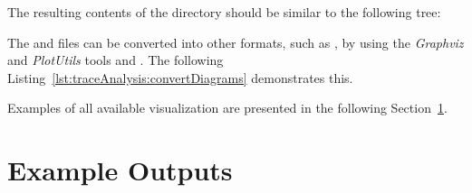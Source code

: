 \setBashListing



\enlargethispage{1cm}


\pagebreak

The resulting contents of the  directory should be similar to %
the following tree:

\begin{figure}[H]
\begin{graybox}
\end{graybox}
\end{figure}

\noindent The  and  files can be converted into other formats, %
such as , by using the \textit{Graphviz} and \textit{PlotUtils} tools %
 and . %
The following Listing~\ref{lst:traceAnalysis:convertDiagrams} demonstrates this. %




%


\vspace{5mm}

Examples of all available visualization are presented in the following %
Section~\ref{sec:traceAnalysisExamples}.

\pagebreak

\section{Example \KiekerTraceAnalysis{} Outputs}\label{sec:traceAnalysisExamples}

